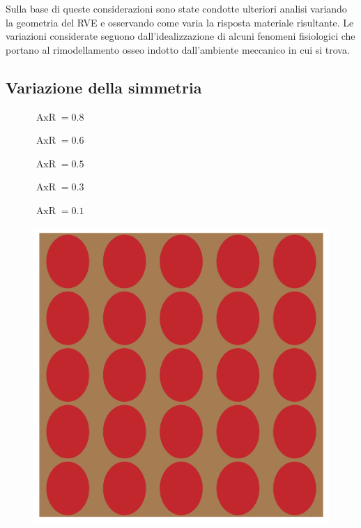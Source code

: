 \documentclass[a4paper,num-refs]{oup-contemporary}
\begin{document}
Sulla base di queste considerazioni sono state condotte ulteriori analisi variando la geometria del RVE e osservando come varia la risposta materiale risultante. Le variazioni considerate seguono dall'idealizzazione di alcuni fenomeni fisiologici che portano al rimodellamento osseo indotto dall'ambiente meccanico in cui si trova.



\subsection{Variazione della simmetria}

\begin{figure} 
	\centering
	\begin{minipage}[b]{0.19\linewidth}
		\centering
		$\operatorname{AxR}=0.8	$
	\end{minipage}
	\begin{minipage}[b]{0.19\linewidth}
		\centering
		$\operatorname{AxR}=0.6	$
	\end{minipage}
	\begin{minipage}[b]{0.19\linewidth}
		\centering
		$	\operatorname{AxR}=0.5$
	\end{minipage}
	\begin{minipage}[b]{0.19\linewidth}
		\centering
		$	\operatorname{AxR}=0.3$
	\end{minipage}
	\begin{minipage}[b]{0.19\linewidth}
		\centering
		$	\operatorname{AxR}=0.1$
	\end{minipage} 
	\begin{minipage}[b]{0.19\linewidth}
		\includegraphics[width=\linewidth]{test_mesh_axR_0.8.png}

\end{minipage}
\end{figure}
\end{document}
